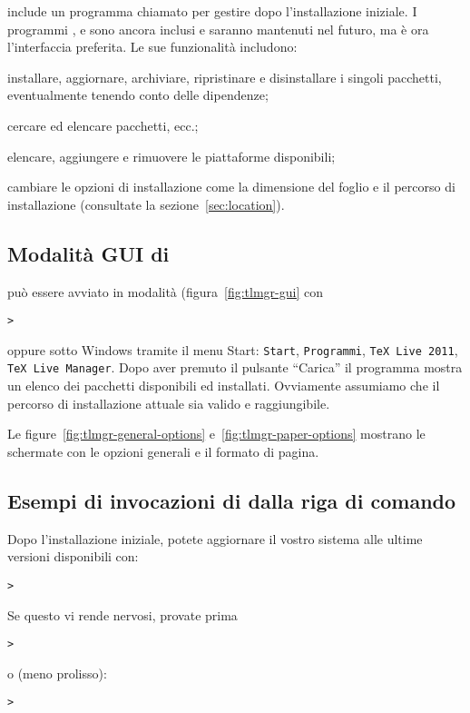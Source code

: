 \documentclass{article}
\begin{document}
\TL{} include un programma chiamato  per gestire \TL{} dopo
l'installazione iniziale. I programmi ,  e
 sono ancora inclusi e saranno mantenuti nel futuro, ma
 è ora l'interfaccia preferita. Le sue funzionalità includono:

\begin{itemize*}
\item installare, aggiornare, archiviare, ripristinare e disinstallare i
  singoli pacchetti, eventualmente tenendo conto delle dipendenze;
\item cercare ed elencare pacchetti, ecc.;
\item elencare, aggiungere e rimuovere le piattaforme disponibili;
\item cambiare le opzioni di installazione come la dimensione del foglio e
  il percorso di installazione (consultate la sezione~\ref{sec:location}).
\end{itemize*}

\subsection{Modalità GUI di }
 può essere avviato in modalità \GUI{}
(figura~\ref{fig:tlmgr-gui} con
\begin{alltt}
> 
\end{alltt}
oppure sotto Windows tramite il menu Start: \texttt{Start},
\texttt{Programmi}, \texttt{TeX Live 2011}, \texttt{TeX Live Manager}.
Dopo aver premuto il pulsante ``Carica'' il programma mostra un elenco dei
pacchetti disponibili ed installati. Ovviamente assumiamo che il percorso
di installazione attuale sia valido e raggiungibile.

Le figure~\ref{fig:tlmgr-general-options} e~\ref{fig:tlmgr-paper-options}
mostrano le schermate con le opzioni generali e il formato di pagina.

\subsection{Esempi di invocazioni di  dalla riga di comando}

Dopo l'installazione iniziale, potete aggiornare il vostro sistema alle
ultime versioni disponibili con:
\begin{alltt}
> 
\end{alltt}
Se questo vi rende nervosi, provate prima
\begin{alltt}
> 
\end{alltt}
o (meno prolisso):
\begin{alltt}
> 
\end{alltt}
\end{document}
